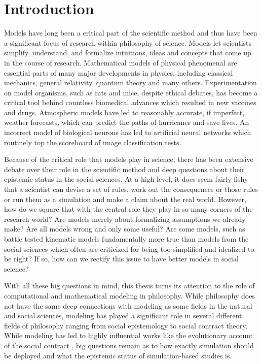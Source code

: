 \hypertarget{introduction}{%
\section{Introduction}\label{introduction}}

Models have long been a critical part of the scientific method and thus
have been a significant focus of research within philosophy of science.
Models let scientists simplify, understand, and formalize intuitions,
ideas and concepts that come up in the course of research. Mathematical
models of physical phenomenal are essential parts of many major
developments in physics, including classical mechanics, general
relativity, quantum theory and many others. Experimentation on model
organisms, such as rats and mice, despite ethical debates, has become a
critical tool behind countless biomedical advances which resulted in new
vaccines and drugs. Atmospheric models have led to reasonably accurate,
if imperfect, weather forecasts, which can predict the paths of
hurricanes and save lives. An incorrect model of biological neurons has
led to artificial neural networks which routinely top the scoreboard of
image classification tests.

Because of the critical role that models play in science, there has been
extensive debate over their role in the scientific method and deep
questions about their epistemic status in the social sciences. At a high
level, it does seem fairly fishy that a scientist can devise a set of
rules, work out the consequences or those rules or run them as a
simulation and make a claim about the real world. However, how do we
square that with the central role they play in so many corners of the
research world? Are models merely about formalizing assumptions we
already make? Are all models wrong and only some useful? Are some
models, such as battle tested kinematic models fundamentally more true
than models from the social sciences which often are criticized for
being too simplified and idealized to be right? If so, how can we
rectify this issue to have better models in social science?

With all these big questions in mind, this thesis turns its attention to
the role of computational and mathematical modeling in philosophy. While
philosophy does not have the same deep connections with modeling as some
fields in the natural and social sciences, modeling has played a
significant role in several different fields of philosophy ranging from
social epistemology to social contract theory. While modeling has led to
highly influential works like the evolutionary account of the social
contract \autocite{skyrmsEvolutionSocialContract2014}, big questions
remain as to how exactly simulation should be deployed and what the
epistemic status of simulation-based studies is.

